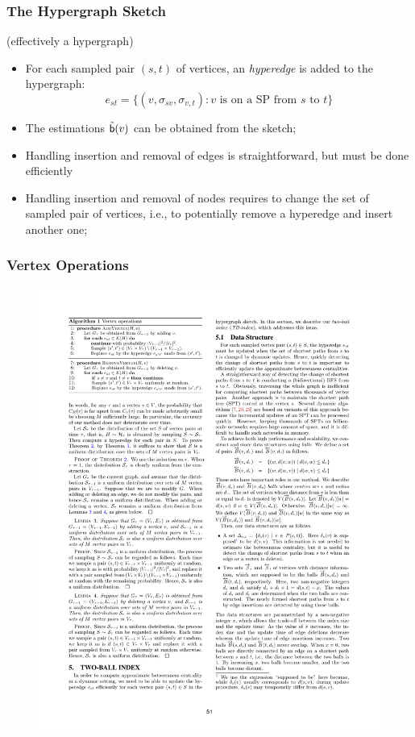 \begin{frame}
  \frametitle{The Hypergraph Sketch}
  (effectively a hypergraph)
  \begin{itemize}
    \item For each sampled pair $(s,t)$ of vertices, an \emph{hyperedge} is
      added to the hypergraph:
      \[
        e_{st}=\{(v,\sigma_{sv}, \sigma_{v,t}) : v \text{ is on a SP from $s$ to
        $t$}\}
      \]
      \pause
    \item The estimations $\tilde{\mathsf{b}}(v)$ can be obtained from the sketch;
      \pause
    \item Handling insertion and removal of edges is straightforward, but must
      be done efficiently
    \item Handling insertion and removal of nodes requires to change the set of
      sampled pair of vertices, i.e., to potentially remove a hyperedge and
      insert another one;
  \end{itemize}
\end{frame}

\begin{frame}
  \frametitle{Vertex Operations}
  \begin{figure}
    \includegraphics[width=\textwidth]{imgs/Ayashi-pseudocode.pdf}
  \end{figure}
\end{frame}

